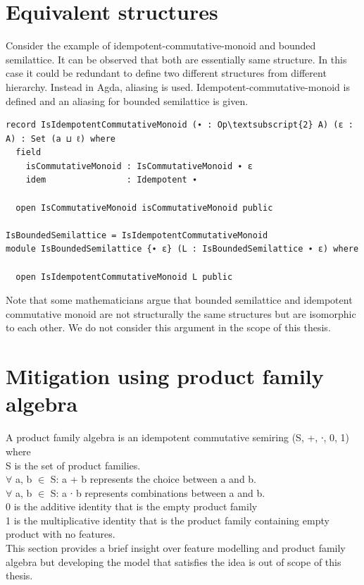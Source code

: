 \section{Equivalent structures}
Consider the example of idempotent-commutative-monoid and bounded semilattice. It can be observed that both are essentially same structure. In this case it could be redundant to define two different structures from different hierarchy. Instead in Agda, aliasing is used. Idempotent-commutative-monoid is defined and an aliasing for bounded semilattice is given.
\begin{Verbatim}[commandchars=\\\{\}]
record IsIdempotentCommutativeMonoid (∙ : Op\textsubscript{2} A) (ε : A) : Set (a ⊔ ℓ) where
  field
    isCommutativeMonoid : IsCommutativeMonoid ∙ ε
    idem                : Idempotent ∙

  open IsCommutativeMonoid isCommutativeMonoid public

IsBoundedSemilattice = IsIdempotentCommutativeMonoid
module IsBoundedSemilattice {∙ ε} (L : IsBoundedSemilattice ∙ ε) where

  open IsIdempotentCommutativeMonoid L public
\end{Verbatim}

Note that some mathematicians argue that bounded semilattice and idempotent commutative monoid are not structurally the same structures but are isomorphic to each other. We do not consider this argument in the scope of this thesis.

\section{Mitigation using product family algebra}
A product family algebra is an idempotent commutative semiring (S, +,  ∙, 0, 1) where \\
 S is the set of product families.\\
 \(\forall\) a, b \(\in\) S: a + b represents the choice between a and b. \\
 \(\forall\) a, b \(\in\) S: a ∙ b represents combinations between a and b.\\
 0 is the additive identity that is the empty product family \\
 1 is the multiplicative identity that is the product family containing empty product with no features.\\

This section provides a brief insight over feature modelling and product family algebra but developing the model that satisfies the idea is out of scope of this thesis.

